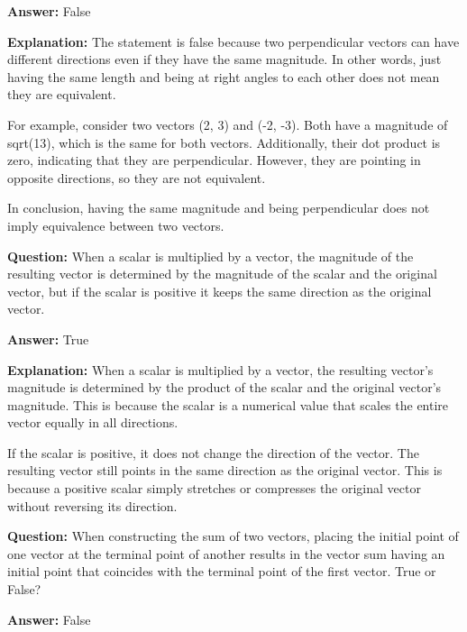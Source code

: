 \documentclass{article}
\begin{document}
                \textbf{Answer:} False

                \textbf{Explanation:} The statement is false because two perpendicular vectors can have different directions even if they have the same magnitude. In other words, just having the same length and being at right angles to each other does not mean they are equivalent.

For example, consider two vectors (2, 3) and (-2, -3). Both have a magnitude of sqrt(13), which is the same for both vectors. Additionally, their dot product is zero, indicating that they are perpendicular. However, they are pointing in opposite directions, so they are not equivalent.

In conclusion, having the same magnitude and being perpendicular does not imply equivalence between two vectors.
                
                \vspace{0.5cm} 
        
            
                \textbf {Question:} When a scalar is multiplied by a vector, the magnitude of the resulting vector is determined by the magnitude of the scalar and the original vector, but if the scalar is positive it keeps the same direction as the original vector.
                
                \textbf{Answer:} True

                \textbf{Explanation:} When a scalar is multiplied by a vector, the resulting vector's magnitude is determined by the product of the scalar and the original vector's magnitude. This is because the scalar is a numerical value that scales the entire vector equally in all directions.

If the scalar is positive, it does not change the direction of the vector. The resulting vector still points in the same direction as the original vector. This is because a positive scalar simply stretches or compresses the original vector without reversing its direction.
                
                \vspace{0.5cm} 
        
            
                \textbf {Question:} When constructing the sum of two vectors, placing the initial point of one vector at the terminal point of another results in the vector sum having an initial point that coincides with the terminal point of the first vector. True or False?
                
                \textbf{Answer:} False
\end{document}
